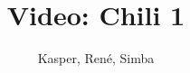 \documentclass[a4paper,11pt]{article}
\title{Video: Chili 1}
\author{Kasper, René, Simba}
\begin{document}
\maketitle

\begin{sketch}


\end{sketch}
\end{document}
